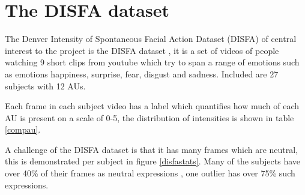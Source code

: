 





    \section{The DISFA dataset} \label{disfa_list}
    The Denver Intensity of Spontaneous Facial Action Dataset (DISFA)
    of central interest to the project is the DISFA dataset \cite{disfa}, it is a set
    of videos of people watching 9 short clips from youtube which try to span a range
    of emotions such as emotions happiness, surprise, fear, disgust and sadness. Included
    are 27 subjects with 12 AUs.

    Each frame in each subject video has a label which quantifies how much of each
    AU is present on a scale of 0-5, the distribution of intensities is shown in table \ref{compau}.

    A challenge of the DISFA dataset is that it has many frames which are neutral, this is demonstrated
    per subject in figure \ref{disfastats}. Many of the subjects have over 40\% of their frames as neutral expressions
    , one outlier has over 75\% such expressions.

